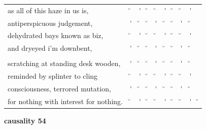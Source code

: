 \documentclass[12pt, landscape]{article}
\begin{document}
\begin{center}
\begin{tabularx}{\textwidth}{
>{\lefting\arraybackslash}X
c
c
c
c
c
c
c
c
c
}

as all of this haze in us is, & \u{} & \'{} & \u{} & \u{} & \'{} & \u{} & \u{} & \'{} & \\
antiperspicuous judgement, & \'{} & \u{} & \u{} & \'{} & \u{} & \u{} & \'{} & \u{} & \\
dehydrated bays known as biz, & \u{} & \'{} & \u{} & \u{} & \'{} & \u{} & \u{} & \'{} & \\
30 and dryeyed i'm downbent, & \'{} & \u{} & \u{} & \'{} & \u{} & \u{} & \'{} & \u{} & \\
 & & & & & & & & \\
scratching at standing desk wooden, & \'{} & \u{} & \u{} & \'{} & \u{} & \u{} & \'{} & \u{} & \\
reminded by splinter to cling & \u{} & \'{} & \u{} & \u{} & \'{} & \u{} & \u{} & \'{} & \\
consciousness, terrored mutation, & \'{} & \u{} & \u{} & \'{} & \u{} & \u{} & \'{} & \u{} & \\
for nothing with interest for nothing. & \u{} & \'{} & \u{} & \u{} & \'{} & \u{} & \u{} & \'{} & \u{} \\

\end{tabularx}
\end{center}

\vspace*{\fill}

\newpage

\vspace*{\fill}

\noindent \textbf{causality 54}
\noindent \hfill \par
\end{document}
